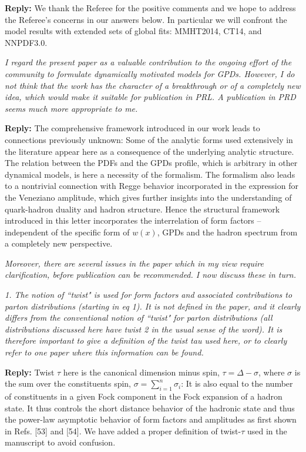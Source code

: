 \documentclass[12pt]{article}
\begin{document}
{\bf Reply:} We thank the Referee for the positive comments and we hope to address the Referee's concerns in our answers below. In particular we will confront the model results with extended sets of global fits: MMHT2014, CT14, and NNPDF3.0.


{\it I regard the present paper as a valuable contribution to the ongoing
effort of the community to formulate dynamically motivated models for
GPDs. However, I do not think that the work has the character of a
breakthrough or of a completely new idea, which would make it suitable
for publication in PRL. A publication in PRD seems much more
appropriate to me.}


{\bf Reply:} The comprehensive framework introduced in our work leads to connections previously unknown: Some of the analytic forms used extensively in the literature appear here as a consequence of the underlying analytic structure. The relation between the PDFs and the GPDs profile, which is arbitrary in other dynamical models, is here a necessity of the formalism. The formalism also leads to a nontrivial connection with Regge behavior incorporated in the expression for the Veneziano amplitude, which gives further insights into the understanding of quark-hadron duality and hadron  structure. Hence the structural framework introduced in this letter incorporates the interrelation of form factors  --independent of the specific form of $w(x)$, GPDs and the hadron spectrum from a completely new perspective. 



{\it Moreover, there are several issues in the paper which in my view
require clarification, before publication can be recommended. I now
discuss these in turn.}

{\it 1. \it The notion of ``twist" is used for form factors and associated
contributions to parton distributions (starting in eq 1). It is not
defined in the paper, and it clearly differs from the conventional
notion of ``twist" for parton distributions (all distributions
discussed here have twist 2 in the usual sense of the word). It is
therefore important to give a definition of the twist tau used here,
or to clearly refer to one paper where this information can be found.}

{\bf Reply:}  Twist $\tau$ here is the canonical dimension minus spin, $\tau = \Delta - \sigma$, where $\sigma$ is the sum over the constituents  spin, $\sigma = \sum_{i = 1}^n \sigma_i$: It is also equal to the number of constituents in a given Fock component in  the Fock expansion of a hadron state. It thus controls the short distance behavior of the hadronic state and thus the power-law asymptotic behavior of form factors and amplitudes as first shown in Refs.  [53] and [54]. We have added a proper definition of twist-$\tau$ used in the  manuscript to avoid confusion.
\end{document}
